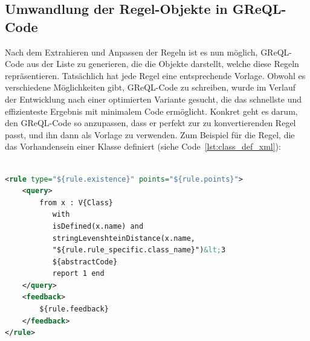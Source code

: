 \subsection{Umwandlung der Regel-Objekte in GReQL-Code}\label{subsec:umwandlung-der-regel-objekte-in-greql-code}
Nach dem Extrahieren und Anpassen der Regeln ist es nun möglich, GReQL-Code aus der Liste zu generieren, die die Objekte
darstellt, welche diese Regeln repräsentieren. Tatsächlich hat jede Regel eine entsprechende Vorlage. Obwohl es
verschiedene Möglichkeiten gibt, GReQL-Code zu schreiben, wurde im Verlauf der Entwicklung nach einer optimierten
Variante gesucht, die das schnellste und effizienteste Ergebnis mit minimalem Code ermöglicht. Konkret geht es darum,
den GReQL-Code so anzupassen, dass er perfekt zur zu konvertierenden Regel passt, und ihn dann als Vorlage zu verwenden.
Zum Beispiel für die Regel, die das Vorhandensein einer Klasse definiert (siehe Code~\ref{lst:class_def_xml}):
\\~\\
\begin{lstlisting}[caption={Class Definition Template \(erster Teil\)}, label={lst:class_def_xml}, language=xml]
<rule type="${rule.existence}" points="${rule.points}">
    <query>
        from x : V{Class}
           with
           isDefined(x.name) and
           stringLevenshteinDistance(x.name,
           "${rule.rule_specific.class_name}")&lt;3
           ${abstractCode}
           report 1 end
    </query>
    <feedback>
        ${rule.feedback}
    </feedback>
</rule>
\end{lstlisting}

